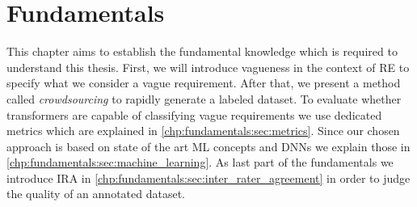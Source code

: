 \chapter{Fundamentals}
\label{chp:fundamentals}

This chapter aims to establish the fundamental knowledge which is required to understand this thesis.
First, we will introduce vagueness in the context of \ac{RE} to specify what we consider a vague requirement.
After that, we present a method called \textit{crowdsourcing} to rapidly generate a labeled dataset.
To evaluate whether transformers are capable of classifying vague requirements we use dedicated metrics which are explained in \cref{chp:fundamentals:sec:metrics}.
Since our chosen approach is based on state of the art \ac{ML} concepts and \acp{DNN} we explain those in \cref{chp:fundamentals:sec:machine_learning}.
As last part of the fundamentals we introduce \ac{IRA} in \cref{chp:fundamentals:sec:inter_rater_agreement} in order to judge the quality of an annotated dataset.






